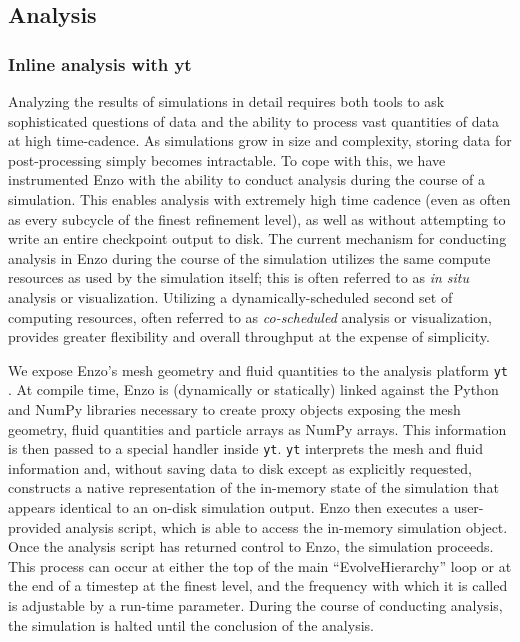 \subsection{Analysis}
\label{sec.num.analysis}

\subsubsection{Inline analysis with yt}

Analyzing the results of simulations in detail requires both tools to ask
sophisticated questions of data and the ability to process vast quantities of
data at high time-cadence.  As simulations grow in size and complexity, storing data
for post-processing simply becomes intractable.  To cope with this, we have
instrumented Enzo with the ability to conduct analysis during the course of a
simulation.  This enables analysis with extremely high time cadence (even as often
as every subcycle of the finest refinement level), as well as without
attempting to write an entire checkpoint output to disk.  The current mechanism
for conducting analysis in Enzo during the course of the simulation utilizes
the same compute resources as used by the simulation itself; this is often
referred to as \textit{in situ} analysis or visualization.  Utilizing a
dynamically-scheduled second set of computing resources, often referred to as
\textit{co-scheduled} analysis or visualization, provides greater flexibility and overall
throughput at the expense of simplicity.

We expose Enzo's mesh geometry and fluid quantities to the analysis platform
\texttt{yt} \citep{2011ApJS..192....9T, 2011arXiv1112.4482T}.  At compile time,
Enzo is (dynamically or statically) linked against the Python and NumPy
libraries necessary to create proxy objects exposing the mesh geometry,
fluid quantities and particle arrays as NumPy arrays.  This information is then
passed to a special handler inside \texttt{yt}.  \texttt{yt} interprets the
mesh and fluid information and, without saving data to disk except as
explicitly requested, constructs a native representation of the in-memory state
of the simulation that appears identical to an on-disk simulation output.
Enzo then executes a user-provided analysis script, which is able to access the
in-memory simulation object.  Once the analysis script has returned control to
Enzo, the simulation proceeds.  This process can occur at either the top of the
main ``EvolveHierarchy'' loop or at the end of a timestep at the finest level,
and the frequency with which it is called is adjustable by a run-time
parameter.  During the course of conducting analysis, the simulation is halted
until the conclusion of the analysis.

